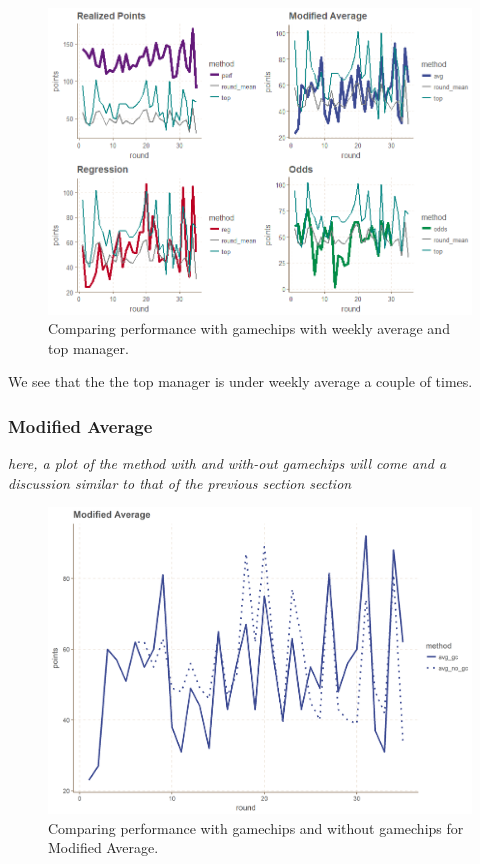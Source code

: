 \begin{figure}[H]
    \centering
    \includegraphics[scale=0.5]{fig/chapter_7/top_mean.png}
    \caption{Comparing performance with gamechips with weekly average and top manager.}
\label{fig:top_mean}    
\end{figure}

We see that the the top manager is under weekly average a couple of times.


\subsubsection{Modified Average}
\textit{here, a plot of the method with and with-out gamechips will come and a discussion similar to that of the previous section section}


\begin{figure}[H]
    \centering
    \includegraphics[scale=0.5]{fig/chapter_7/avg_gc_no_gc.png}
    \caption{Comparing performance with gamechips and without gamechips for Modified Average.}
\label{fig:avg_gc_no_gc}    
\end{figure}


